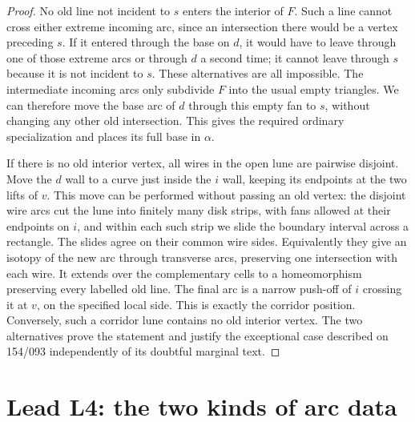 \documentclass[11pt,a4paper]{article}
\begin{document}
\begin{proof}
No old line not incident to $s$ enters the interior of $F$.  Such a
line cannot cross either extreme incoming arc, since an intersection
there would be a vertex preceding $s$.  If it entered through the
base on $d$, it would have to leave through one of those extreme
arcs or through $d$ a second time; it cannot leave through $s$
because it is not incident to $s$.  These alternatives are all
impossible.  The intermediate incoming arcs only subdivide $F$
into the usual empty triangles.  We can therefore move the base
arc of $d$ through this empty fan to $s$, without changing any
other old intersection.  This gives the required ordinary
specialization and places its full base in $\alpha$.

If there is no old interior vertex, all wires in the open lune are
pairwise disjoint.  Move the $d$ wall to a curve just inside the
$i$ wall, keeping its endpoints at the two lifts of $v$.  This move
can be performed without passing an old vertex: the disjoint
wire arcs cut the lune into finitely many disk strips, with fans
allowed at their endpoints on $i$, and within each such strip we
slide the boundary interval across a rectangle.  The slides agree
on their common wire sides.  Equivalently they give an isotopy of
the new arc through transverse arcs, preserving one intersection
with each wire.  It extends over the complementary cells to a
homeomorphism preserving every labelled old line.  The final arc
is a narrow push-off of $i$ crossing it at $v$, on the specified
local side.  This is exactly the corridor position.  Conversely,
such a corridor lune contains no old interior vertex.  The two
alternatives prove the statement and justify the exceptional case
described on 154/093 independently of its doubtful marginal text.
\end{proof}
\section{Lead L4: the two kinds of arc data}
\end{document}
